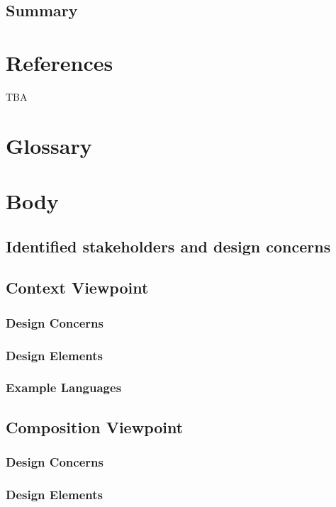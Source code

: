 \documentclass[onecolumn, draftclsnofoot,10pt, compsoc]{IEEEtran}
\begin{document}
\subsection{Summary}

\section{References}
TBA

\section{Glossary}

\section{Body}
\subsection{Identified stakeholders and design concerns}
\subsection{Context Viewpoint}
\subsubsection{Design Concerns}

\subsubsection{Design Elements}

\subsubsection{Example Languages}

\subsection{Composition Viewpoint}
\subsubsection{Design Concerns}

\subsubsection{Design Elements}
\end{document}
